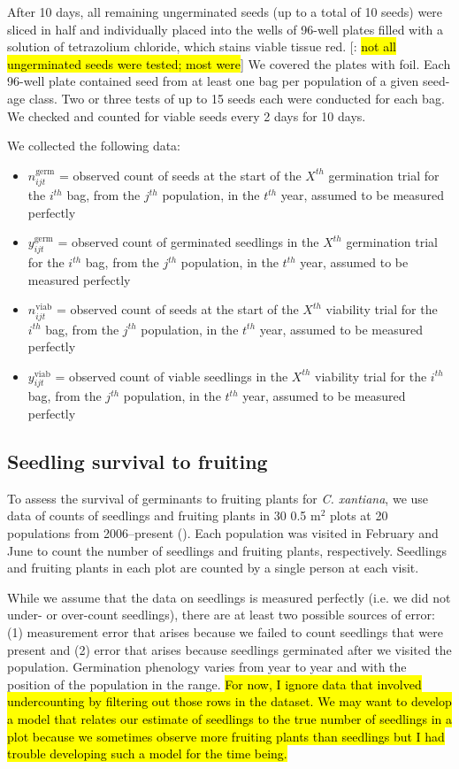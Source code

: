 \documentclass[12pt, oneside, titlepage]{article}   	%
\begin{document}
After 10 days, all remaining ungerminated seeds (up to a total of 10 seeds) were sliced in half and individually placed into the wells of 96-well plates filled with a solution of tetrazolium chloride, which stains viable tissue red. [\cite{eckhart2011}: \hl{not all ungerminated seeds were tested; most were}] We covered the plates with foil. Each 96-well plate contained seed from at least one bag per population of a given seed-age class. Two or three tests of up to 15 seeds each were conducted for each bag. We checked and counted for viable seeds every 2 days for 10 days. 

We collected the following data: 

\begin{itemize}
	\item $n^{\mathrm{germ}}_{ijt}$ = observed count of seeds at the start of the $X^{th}$ germination trial for the $i^{th}$ bag, from the $j^{th}$ population, in the $t^{th}$ year, assumed to be measured perfectly
	\item $y^{\mathrm{germ}}_{ijt}$ = observed count of germinated seedlings in the $X^{th}$ germination trial for the $i^{th}$ bag, from the $j^{th}$ population, in the $t^{th}$ year, assumed to be measured perfectly 
	\item $n^{\mathrm{viab}}_{ijt}$ = observed count of seeds at the start of the $X^{th}$ viability trial for the $i^{th}$ bag, from the $j^{th}$ population, in the $t^{th}$ year, assumed to be measured perfectly 
	\item $y^{\mathrm{viab}}_{ijt}$ = observed count of viable seedlings in the $X^{th}$ viability trial for the $i^{th}$ bag, from the $j^{th}$ population, in the $t^{th}$ year, assumed to be measured perfectly 
\end{itemize}

\subsection{Seedling survival to fruiting}

To assess the survival of germinants to fruiting plants for \textit{C. xantiana}, we use data of counts of seedlings and fruiting plants in 30 0.5 m$^2$ plots at 20 populations from 2006--present (\cite{eckhart2011}). Each population was visited in February and June to count the number of seedlings and fruiting plants, respectively. Seedlings and fruiting plants in each plot are counted by a single person at each visit. 

While we assume that the data on seedlings is measured perfectly (i.e. we did not under- or over-count seedlings), there are at least two possible sources of error: (1) measurement error that arises because we failed to count seedlings that were present and (2) error that arises because seedlings germinated after we visited the population. Germination phenology varies from year to year and with the position of the population in the range. \hl{For now, I ignore data that involved undercounting by filtering out those rows in the dataset. We may want to develop a model that relates our estimate of seedlings to the true number of seedlings in a plot because we sometimes observe more fruiting plants than seedlings but I had trouble developing such a model for the time being.}
\end{document}
